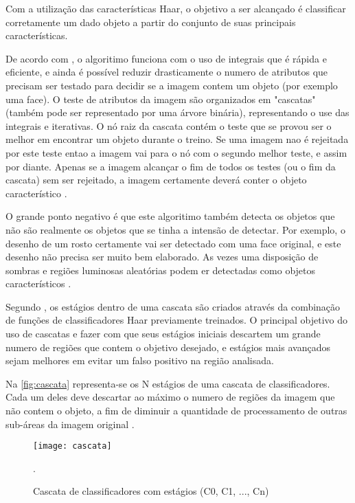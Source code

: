 Com a utilização das características Haar, o objetivo a ser alcançado é classificar corretamente um dado objeto a partir do conjunto de suas principais características. 

De acordo com \cite{drmathew_java_programming}, o algoritimo funciona com o uso de integrais que é rápida e eficiente, e ainda é possível reduzir drasticamente o numero de atributos que precisam ser testado para decidir se a imagem contem um objeto (por exemplo uma face). O teste de atributos da imagem são organizados em "cascatas" (também pode ser representado por uma árvore binária), representando o use das integrais e  iterativas. O nó raiz da cascata contém o teste que se provou ser o melhor em encontrar um objeto durante o treino. Se uma imagem nao é rejeitada por este teste entao a imagem vai para o nó com o segundo melhor teste, e assim por diante. Apenas se a imagem alcançar o fim de todos os testes (ou o fim da cascata) sem ser rejeitado, a imagem certamente deverá conter o objeto característico .

O grande ponto negativo é que este algoritimo também detecta os objetos que não são realmente os objetos que se tinha a intensão de detectar\cite{drmathew_java_programming}. Por exemplo, o desenho de um rosto certamente vai ser detectado com uma face original, e este desenho não precisa ser muito bem elaborado. As vezes uma disposição de sombras e regiões luminosas aleatórias podem er detectadas como objetos característicos .

Segundo \cite{gustavo_cascata}, os estágios dentro de uma cascata são criados através da combinação de funções de classificadores Haar previamente treinados. O principal objetivo do uso de cascatas e fazer com que seus estágios iniciais descartem um grande numero de regiões que contem o objetivo desejado, e estágios mais avançados sejam melhores em evitar um falso positivo na região analisada. 

Na \autoref{fig:cascata} representa-se os N estágios de uma cascata de classificadores. Cada um deles deve descartar ao máximo o numero de regiões da imagem que não contem o objeto, a fim de diminuir a quantidade de processamento de outras sub-áreas da imagem original \cite{gustavo_cascata}.

 \begin{figure}[h]
	\centering
	\texttt{[image: cascata]}
	\caption{Cascata de classificadores com estágios (C0, C1, ..., Cn)}.
	\label{fig:cascata}
\end{figure}

